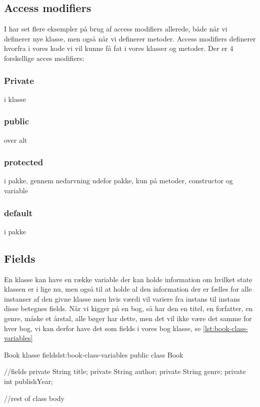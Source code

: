 \subsection{Access modifiers}

I har set flere eksempler på brug af access modifiers allerede, både når vi definerer nye klasse, men også når vi definerer metoder. Access modifiers definerer hvorfra i vores kode vi vil kunne få fat i vores klasser og metoder. Der er 4 forskellige acces modifiers:

\subsubsection{Private}

i klasse

\subsubsection{public} 

over alt

\subsubsection{protected} 

i pakke, gennem nedarvning udefor pakke, kun på metoder, constructor og variable

\subsubsection{default} 

i pakke

\subsection{Fields}
En klasse kan have en række variable der kan holde information om hvilket state klassen er i lige nu, men også til at holde al den information der er fælles for alle instanser af den givne klasse men hvis værdi vil variere fra instans til instans disse betegnes fields. Når vi kigger på en bog, så har den en titel, en forfatter, en genre, måske et årstal, alle bøger har dette, men det vil ikke være det samme for hver bog, vi kan derfor have det som fields i vores bog klasse, se \autoref{lst:book-class-variables}

\begin{JavaCode}{Book klasse fields}{lst:book-class-variables}
	public class Book {
		//fields
		private String title;
		private String author;
		private String genre;
		private int publishYear;
		
		//rest of class body
	}
\end{JavaCode}

